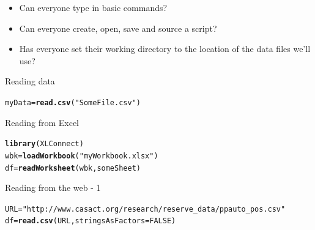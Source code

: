 \documentclass[xcolor=dvipsnames]{beamer}
\makeatletter
\newcommand{\hlnum}[1]{\textcolor[rgb]{0.686,0.059,0.569}{#1}}%
\newcommand{\hlstr}[1]{\textcolor[rgb]{0.192,0.494,0.8}{#1}}%
\newcommand{\hlstd}[1]{\textcolor[rgb]{0.345,0.345,0.345}{#1}}%
\newcommand{\hlkwb}[1]{\textcolor[rgb]{0.69,0.353,0.396}{#1}}%
\newcommand{\hlkwc}[1]{\textcolor[rgb]{0.333,0.667,0.333}{#1}}%
\newcommand{\hlkwd}[1]{\textcolor[rgb]{0.737,0.353,0.396}{\textbf{#1}}}%
\newenvironment{kframe}{%
 \def\at@end@of@kframe{}%
 \ifinner\ifhmode%
  \def\at@end@of@kframe{\end{minipage}}%
  \begin{minipage}{\columnwidth}%
 \fi\fi%
 \def\FrameCommand##1{\hskip\@totalleftmargin \hskip-\fboxsep
 \colorbox{shadecolor}{##1}\hskip-\fboxsep
     \hskip-\linewidth \hskip-\@totalleftmargin \hskip\columnwidth}%
 \MakeFramed {\advance\hsize-\width
   \@totalleftmargin\z@ \linewidth\hsize
   \@setminipage}}%
 {\par\unskip\endMakeFramed%
 \at@end@of@kframe}
\newenvironment{knitrout}{}{} %
\makeatother
\begin{document}
\begin{frame}
\begin{itemize}
  \item Can everyone type in basic commands?
  \item Can everyone create, open, save and source a script?
  \item Has everyone set their working directory to the location of the data files we'll use?
\end{itemize}
\end{frame}

\begin{frame}[fragile]{Reading data}
\begin{knitrout}
\color{fgcolor}\begin{kframe}
\begin{alltt}
\hlstd{myData} \hlkwb{=} \hlkwd{read.csv}\hlstd{(}\hlstr{"SomeFile.csv"}\hlstd{)}
\end{alltt}
\end{kframe}
\end{knitrout}

\end{frame}

\begin{frame}[fragile]{Reading from Excel}
\begin{knitrout}
\color{fgcolor}\begin{kframe}
\begin{alltt}
\hlkwd{library}\hlstd{(XLConnect)}
\hlstd{wbk} \hlkwb{=} \hlkwd{loadWorkbook}\hlstd{(}\hlstr{"myWorkbook.xlsx"}\hlstd{)}
\hlstd{df} \hlkwb{=} \hlkwd{readWorksheet}\hlstd{(wbk, someSheet)}
\end{alltt}
\end{kframe}
\end{knitrout}

\end{frame}

\begin{frame}[fragile]{Reading from the web - 1}
\begin{knitrout}\tiny
{}\color{fgcolor}\begin{kframe}
\begin{alltt}
\hlstd{URL} \hlkwb{=} \hlstr{"http://www.casact.org/research/reserve_data/ppauto_pos.csv"}
\hlstd{df} \hlkwb{=} \hlkwd{read.csv}\hlstd{(URL,} \hlkwc{stringsAsFactors} \hlstd{=} \hlnum{FALSE}\hlstd{)}
\end{alltt}
\end{kframe}
\end{knitrout}

\end{frame}
\end{document}
